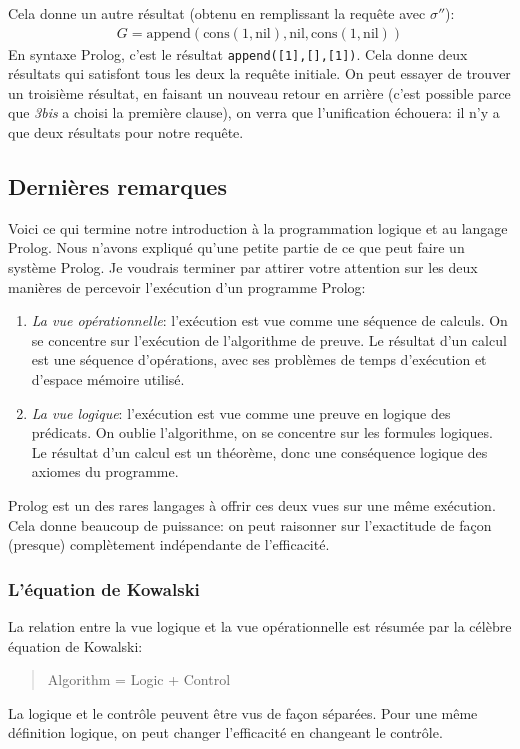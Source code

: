 Cela donne un autre résultat (obtenu en remplissant la requête avec $\sigma''$):
\begin{equation}
\begin{array}{l}
G = \mathrm{append}(\mathrm{cons}(1,\mathrm{nil}), \mathrm{nil}, \mathrm{cons}(1,\mathrm{nil}))
\end{array}
\end{equation}
En syntaxe Prolog, c'est le résultat \verb+append([1],[],[1])+.
Cela donne deux résultats qui satisfont tous les deux la requête initiale.
On peut essayer de trouver un troisième résultat, en faisant un nouveau retour en arrière
(c'est possible parce que {\em 3bis} a choisi la première clause),
on verra que l'unification échouera: il n'y a que deux résultats pour notre requête.

\subsection{Dernières remarques}

Voici ce qui termine notre introduction à la programmation logique et au langage Prolog.
Nous n'avons expliqué qu'une petite partie de ce que peut faire un système Prolog.
Je voudrais terminer par attirer votre attention sur les
deux manières de percevoir l'exécution d'un programme Prolog:
\begin{enumerate}
\item {\em La vue opérationnelle}: l'exécution est vue comme une séquence de calculs.
On se concentre sur l'exécution de l'algorithme de preuve.
Le résultat d'un calcul est une séquence d'opérations, avec ses problèmes de temps
d'exécution et d'espace mémoire utilisé.
\item {\em La vue logique}: l'exécution est vue comme une preuve en logique des prédicats.
On oublie l'algorithme, on se concentre sur les formules logiques.
Le résultat d'un calcul est un théorème, donc une conséquence logique des axiomes du programme.
\end{enumerate}
Prolog est un des rares langages à offrir ces deux vues sur une même exécution.
Cela donne beaucoup de puissance: on peut raisonner sur l'exactitude de façon (presque) complètement
indépendante de l'efficacité.

\subsubsection{L'équation de Kowalski}

La relation entre la vue logique et la vue opérationnelle
est résumée par la célèbre équation de Kowalski:
\begin{quote}
Algorithm = Logic + Control
\end{quote}
La logique et le contrôle peuvent être vus de façon séparées.
Pour une même définition logique, on peut changer l'efficacité
en changeant le contrôle.

